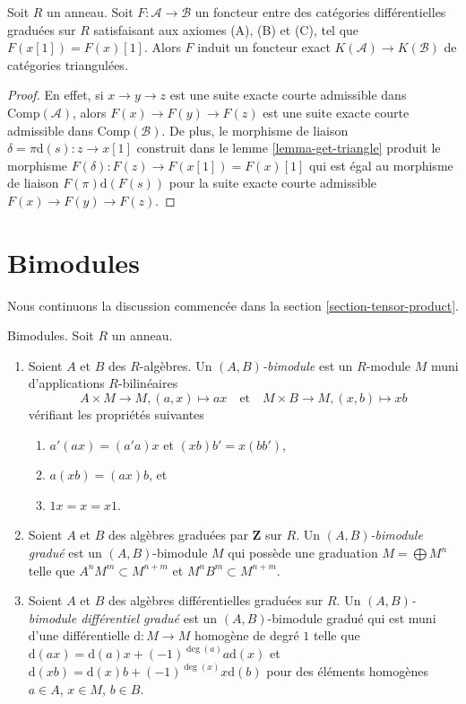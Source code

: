\begin{lemma}
\label{lemma-functor-between-ABC}
Soit $R$ un anneau. Soit $F : \mathcal{A} \to \mathcal{B}$ un foncteur
entre des catégories différentielles graduées sur $R$ satisfaisant aux
axiomes (A), (B) et (C), tel que $F(x[1]) =
F(x)[1]$. Alors $F$ induit un foncteur
exact $K(\mathcal{A}) \to K(\mathcal{B})$ de catégories triangulées.
\end{lemma}

\begin{proof}
En effet, si $x \to y \to z$ est une suite exacte courte
admissible dans $\text{Comp}(\mathcal{A})$, alors $F(x) \to F(y) \to
F(z)$ est une suite exacte courte admissible dans
$\text{Comp}(\mathcal{B})$. De plus, le morphisme de liaison $\delta = \pi\text{d}(s) : z \to x[1]$
construit dans le lemme \ref{lemma-get-triangle} produit le morphisme
$F(\delta) : F(z) \to F(x[1]) = F(x)[1]$ qui est égal au morphisme de
liaison $F(\pi) \text{d}(F(s))$ pour la suite exacte courte admissible $F(x)
\to F(y) \to F(z)$.
\end{proof}





\section{Bimodules}
\label{section-bimodules}

\noindent
Nous continuons la discussion commencée dans la section \ref{section-tensor-product}.

\begin{definition}
\label{definition-bimodule}
Bimodules. Soit $R$ un anneau.
\begin{enumerate}
\item Soient $A$ et $B$ des $R$-algèbres. Un {\it $(A, B)$-bimodule}
est un $R$-module $M$ muni d'applications $R$-bilinéaires
$$
A \times M \to M, (a, x) \mapsto ax
\quad\text{et}\quad
M \times B \to M, (x, b) \mapsto xb
$$
vérifiant les propriétés suivantes
\begin{enumerate}
\item $a'(ax) = (a'a)x$ et $(xb)b' = x(bb')$,
\item $a(xb) = (ax)b$, et
\item $1 x = x = x 1$.
\end{enumerate}
\item Soient $A$ et $B$ des algèbres graduées par $\mathbf{Z}$ sur
$R$. Un {\it $(A, B)$-bimodule gradué} est un $(A, B)$-bimodule $M$ qui
possède une graduation $M = \bigoplus M^n$
telle que $A^n M^m \subset M^{n + m}$ et $M^n B^m \subset M^{n + m}$.
\item Soient $A$ et $B$ des algèbres différentielles graduées
sur $R$. Un {\it $(A, B)$-bimodule différentiel gradué} est un $(A,
B)$-bimodule gradué qui est muni d'une
différentielle $\text{d} : M \to M$ homogène de degré $1$
telle que $\text{d}(ax) = \text{d}(a)x + (-1)^{\deg(a)}a\text{d}(x)$ et
$\text{d}(xb) = \text{d}(x)b + (-1)^{\deg(x)}x\text{d}(b)$ pour
des éléments homogènes $a \in A$, $x \in M$, $b \in B$.
\end{enumerate}
\end{definition}

